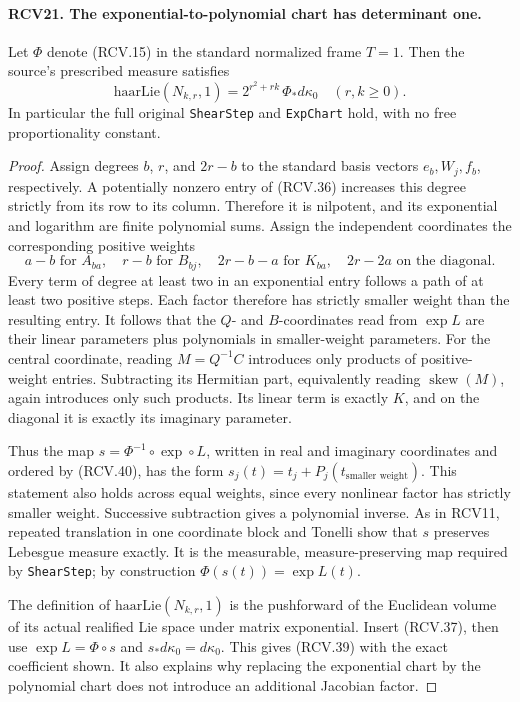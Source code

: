 \paragraph{RCV21. The exponential-to-polynomial chart has determinant one.}
\label{claim:RCV21}
Let \(\Phi\) denote (RCV.15) in the standard normalized frame
\(T=1\).  Then the source's prescribed measure satisfies
\[
 \mathrm{haarLie}(N_{k,r},1)
   =2^{r^2+rk}\,\Phi_*d\kappa_0
                     \quad(r,k\geq0).
\tag{RCV.39}
\]
In particular the full original \texttt{ShearStep} and
\texttt{ExpChart} hold, with no free proportionality constant.
\begin{proof}
Assign degrees \(b\), \(r\), and \(2r-b\) to the standard
basis vectors \(e_b,W_j,f_b\), respectively.  A potentially
nonzero entry of (RCV.36) increases this degree strictly from its
row to its column.  Therefore it is nilpotent, and its exponential
and logarithm are finite polynomial sums.  Assign the independent
coordinates the corresponding positive weights
\[
 a-b\text{ for }A_{ba},\quad r-b\text{ for }B_{bj},\quad
 2r-b-a\text{ for }K_{ba},\quad 2r-2a\text{ on the diagonal}.
\tag{RCV.40}
\]
Every term of degree at least two in an exponential entry follows
a path of at least two positive steps.  Each factor therefore has
strictly smaller weight than the resulting entry.  It follows that
the \(Q\)- and \(B\)-coordinates read from \(\exp L\) are
their linear parameters plus polynomials in smaller-weight parameters.
For the central coordinate, reading \(M=Q^{-1}C\) introduces
only products of positive-weight entries.  Subtracting its Hermitian
part, equivalently reading \(\operatorname{skew}(M)\), again
introduces only such products.  Its linear term is exactly \(K\),
and on the diagonal it is exactly its imaginary parameter.

Thus the map \(s=\Phi^{-1}\circ\exp\circ L\), written in
real and imaginary coordinates and ordered by (RCV.40), has the form
\(s_j(t)=t_j+P_j(t_{\text{smaller weight}})\).  This statement
also holds across equal weights, since every nonlinear factor has
strictly smaller weight.  Successive subtraction gives a polynomial
inverse.  As in RCV11, repeated translation in one coordinate block
and Tonelli show that \(s\) preserves Lebesgue measure exactly.
It is the measurable, measure-preserving map required by
\texttt{ShearStep}; by construction \(\Phi(s(t))=\exp L(t)\).

The definition of \(\mathrm{haarLie}(N_{k,r},1)\) is the
pushforward of the Euclidean volume of its actual realified Lie
space under matrix exponential.  Insert (RCV.37), then use
\(\exp L=\Phi\circ s\) and \(s_*d\kappa_0=d\kappa_0\).
This gives (RCV.39) with the exact coefficient shown.  It also
explains why replacing the exponential chart by the polynomial
chart does not introduce an additional Jacobian factor.
\end{proof}

